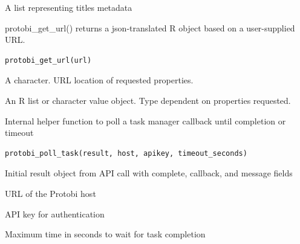 \documentclass[a4paper]{book}
\begin{document}
%
\begin{Value}
A list representing titles metadata
\end{Value}
%
\begin{Description}\relax
protobi\_get\_url() returns a json-translated R object based on a user-supplied URL.
\end{Description}
%
\begin{Usage}
\begin{verbatim}
protobi_get_url(url)
\end{verbatim}
\end{Usage}
%
\begin{Arguments}
\begin{ldescription}
\item[\code{url}] A character. URL location of requested properties.
\end{ldescription}
\end{Arguments}
%
\begin{Value}
An R list or character value object. Type dependent on properties requested.
\end{Value}
%
\begin{SeeAlso}
\end{SeeAlso}
%
\begin{Description}\relax
Internal helper function to poll a task manager callback until completion or timeout
\end{Description}
%
\begin{Usage}
\begin{verbatim}
protobi_poll_task(result, host, apikey, timeout_seconds)
\end{verbatim}
\end{Usage}
%
\begin{Arguments}
\begin{ldescription}
\item[\code{result}] Initial result object from API call with complete, callback, and message fields

\item[\code{host}] URL of the Protobi host

\item[\code{apikey}] API key for authentication

\item[\code{timeout\_seconds}] Maximum time in seconds to wait for task completion
\end{ldescription}
\end{Arguments}
\end{document}
